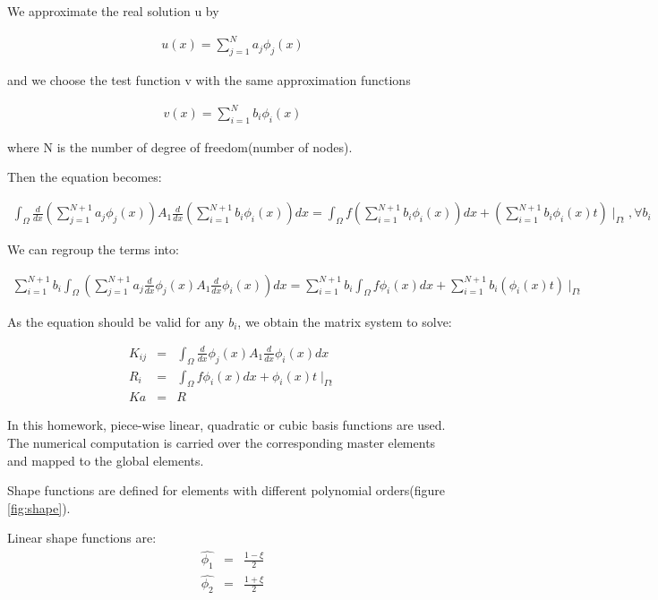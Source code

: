 \documentclass[paper=a4, fontsize=11pt]{article} %
\begin{document}
We approximate the real solution u by

\begin{eqnarray}
u(x) = \sum_{j=1}^{N} a_j \phi_j(x)
\end{eqnarray}

and we choose the test function v with the same approximation functions

\begin{eqnarray}
v(x) = \sum_{i=1}^{N} b_i \phi_i(x)
\end{eqnarray}

where N is the number of degree of freedom(number of nodes). 


Then the equation becomes:

\begin{eqnarray}
\int_{\Omega} \frac{d}{dx} (\sum_{j=1}^{N+1} a_j \phi_j(x)) A_1 \frac{d}{dx} (\sum_{i=1}^{N+1} b_i \phi_i(x))dx = \int_{\Omega} f (\sum_{i=1}^{N+1} b_i \phi_i(x)) dx + (\sum_{i=1}^{N+1} b_i \phi_i(x) t) \mid _{\Gamma t}, \forall b_i
\end{eqnarray}


We can regroup the terms into:

\begin{eqnarray}
\sum_{i=1}^{N+1} b_i \int_{\Omega} (\sum_{j=1}^{N+1} a_j \frac{d}{dx} \phi_j(x) A_1 \frac{d}{dx} \phi_i(x)) dx = \sum_{i=1}^{N+1} b_i \int_{\Omega} f \phi_i(x) dx + \sum_{i=1}^{N+1} b_i (\phi_i(x) t) \mid _{\Gamma t}
\end{eqnarray}

As the equation should be valid for any $b_i$, we obtain the matrix system to solve:
 
\begin{eqnarray}
K_{ij} &=& \int_{\Omega} \frac{d}{dx} \phi_j(x) A_1 \frac{d}{dx} \phi_i(x) dx \nonumber\\
R_i &=& \int_{\Omega} f \phi_i(x) dx + \phi_i(x) t \mid _{\Gamma t}\nonumber\\
K a &=& R
\end{eqnarray}


In this homework, piece-wise linear, quadratic or cubic basis functions are used. The numerical computation is carried over the corresponding master elements and mapped to the global elements. 

Shape functions are defined for elements with different polynomial orders(figure \ref{fig:shape}).

Linear shape functions are:
\begin{eqnarray}
\hat{\phi_1} &=& \frac{1-\xi}{2}\nonumber\\
\hat{\phi_2} &=& \frac{1+\xi}{2}
\end{eqnarray}
\end{document}
